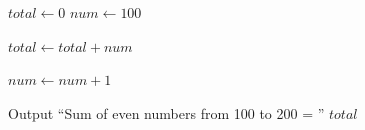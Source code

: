 \begin{algorithm}
\caption{Sum of Even Numbers from 100 to 200}
\begin{algorithmic}[1]

\STATE $total \gets 0$
\STATE $num \gets 100$


        \STATE $total \gets total + num$
    \ENDIF

    \STATE $num \gets num + 1$

\ENDWHILE

\STATE Output ``Sum of even numbers from 100 to 200 = '' $total$

\end{algorithmic}
\end{algorithm}